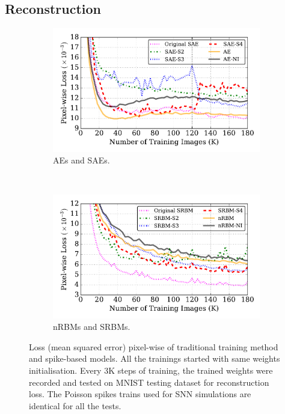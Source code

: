 \subsection{Reconstruction}

\begin{figure}
	\centering
	\begin{subfigure}[t]{0.8\textwidth}
		\includegraphics[width=\textwidth]{pics_sdlm/53_MNIST_SRBM_all/compare_recon.pdf}
		\caption{AEs and SAEs.}
	\end{subfigure}\\
	\begin{subfigure}[t]{0.8\textwidth}
		\includegraphics[width=\textwidth]{pics_sdlm/53_MNIST_SRBM_all/compare_recon_rbm.pdf}
		\caption{nRBMs and SRBMs.}
	\end{subfigure}
	\caption{Loss (mean squared error) pixel-wise of traditional training method and spike-based models. All the trainings started with same weights initialisation. Every 3K steps of training, the trained weights were recorded and tested on MNIST testing dataset for reconstruction loss. The Poisson spikes trains used for SNN simulations are identical for all the tests.}
	\label{fig:sdlm_loss}
\end{figure}

